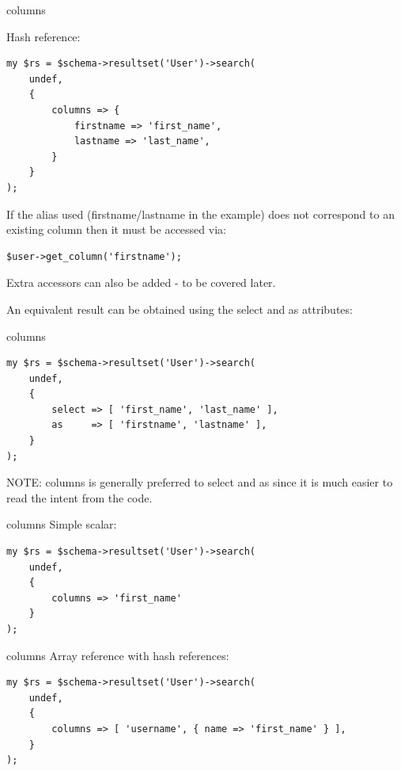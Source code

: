 \begin{frame}[fragile]{columns}

Hash reference:

\begin{lstlisting}
my $rs = $schema->resultset('User')->search(
    undef,
    {
        columns => {
            firstname => 'first_name',
            lastname => 'last_name',
        }
    }
);
\end{lstlisting}
\end{frame}

If the alias used (firstname/lastname in the example) does not correspond to
an existing column then it must be accessed via:

\begin{lstlisting}
$user->get_column('firstname');
\end{lstlisting}

Extra accessors can also be added - to be covered later.

An equivalent result can be obtained using the select and as attributes:

\begin{frame}[fragile]{columns}
\begin{lstlisting}
my $rs = $schema->resultset('User')->search(
    undef,
    {
        select => [ 'first_name', 'last_name' ],
        as     => [ 'firstname', 'lastname' ],
    }
);
\end{lstlisting}
\end{frame}

NOTE: columns is generally preferred to select and as since it is much
easier to read the intent from the code.

\begin{frame}[fragile]{columns}
Simple scalar:

\begin{lstlisting}
my $rs = $schema->resultset('User')->search(
    undef,
    {
        columns => 'first_name'
    }
);
\end{lstlisting}

\end{frame}

\begin{frame}[fragile]{columns}
Array reference with hash references:

\begin{lstlisting}
my $rs = $schema->resultset('User')->search(
    undef,
    {
        columns => [ 'username', { name => 'first_name' } ],
    }
);
\end{lstlisting}
\end{frame}

